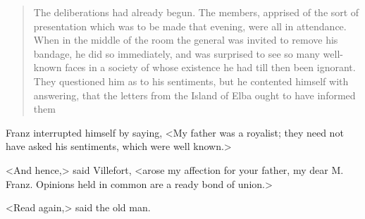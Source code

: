 \begin{quotation}
The deliberations had already begun. The members, apprised of the sort of presentation which was to be made that evening, were all in attendance. When in the middle of the room the general was invited to remove his bandage, he did so immediately, and was surprised to see so many well-known faces in a society of whose existence he had till then been ignorant. They questioned him as to his sentiments, but he contented himself with answering, that the letters from the Island of Elba ought to have informed them\longdash
\end{quotation}
 Franz interrupted himself by saying, <My father was a royalist; they need not have asked his sentiments, which were well known.> 

 <And hence,> said Villefort, <arose my affection for your father, my dear M. Franz. Opinions held in common are a ready bond of union.> 

 <Read again,> said the old man. 

